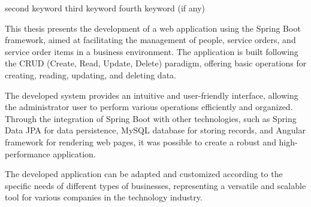 {second keyword}
{third keyword}
{fourth keyword (if any)}




This thesis presents the development of a web application using the Spring Boot framework, aimed at facilitating the management of people, service orders, and service order items in a business environment. The application is built following the CRUD (Create, Read, Update, Delete) paradigm, offering basic operations for creating, reading, updating, and deleting data.

The developed system provides an intuitive and user-friendly interface, allowing the administrator user to perform various operations efficiently and organized. Through the integration of Spring Boot with other technologies, such as Spring Data JPA for data persistence, MySQL database for storing records, and Angular framework for rendering web pages, it was possible to create a robust and high-performance application.

The developed application can be adapted and customized according to the specific needs of different types of businesses, representing a versatile and scalable tool for various companies in the technology industry.\\

\printkeys %

